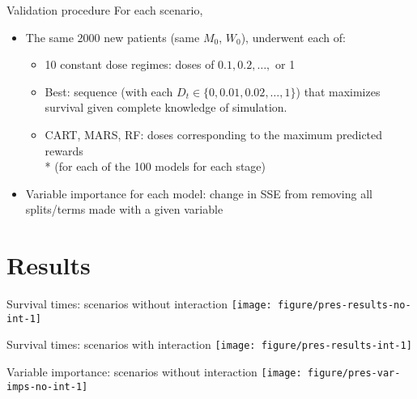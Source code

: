 \documentclass{beamer}
\begin{document}
\begin{frame}[c]{Validation procedure}
  For each scenario,
  \begin{itemize}[<+(1)->]
    \item The same 2000 new patients (same $M_{0}$, $W_{0}$), underwent each of:
  \begin{itemize}[<+(1)->]
    \item 10 constant dose regimes: doses of $0.1, 0.2, \ldots,$ or 1
        \item Best: sequence (with each $D_{t} \in \{0, 0.01, 0.02, \ldots, 1\}$) that maximizes survival given complete knowledge of simulation.
    \item CART, MARS, RF: doses corresponding to the maximum predicted rewards \\* (for each of the 100 models for each stage)
  \end{itemize}
  \item Variable importance for each model: change in SSE from removing all splits/terms made with a given variable 
  \end{itemize}
\end{frame}

\section{Results} %
\label{sec:results}


\begin{frame}[c]{Survival times: scenarios without interaction}
\centering
  \texttt{[image: figure/pres-results-no-int-1]} 
\end{frame}

\begin{frame}[c]{Survival times: scenarios with interaction}
  \centering
  \texttt{[image: figure/pres-results-int-1]} 
\end{frame}

\begin{frame}[c]{Variable importance: scenarios without interaction}
\centering
  \texttt{[image: figure/pres-var-imps-no-int-1]} 
\end{frame}
\end{document}
